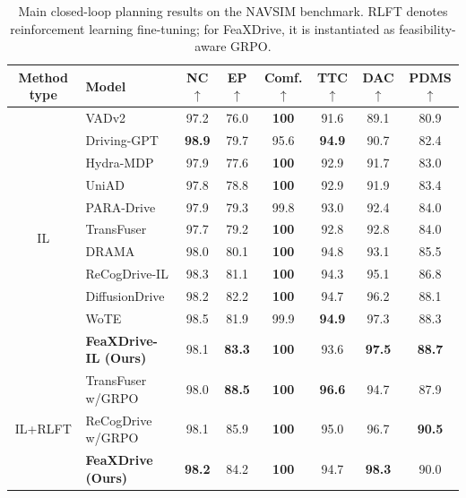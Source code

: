 \documentclass[3p,times,authoryear]{elsarticle}
\begin{document}
\begin{table}[t]
\centering
\caption{Main closed-loop planning results on the NAVSIM benchmark. RLFT denotes reinforcement learning fine-tuning; for FeaXDrive, it is instantiated as feasibility-aware GRPO.}
\small
\setlength{\tabcolsep}{5pt}
\renewcommand{\arraystretch}{1.05}
\begin{tabular}{c|l|c c c c|c|c}
\toprule
\textbf{Method type} & \textbf{Model} & \textbf{NC} $\uparrow$ & \textbf{EP} $\uparrow$ & \textbf{Comf.} $\uparrow$ & \textbf{TTC} $\uparrow$ & \textbf{DAC} $\uparrow$ & \textbf{PDMS} $\uparrow$ \\
\midrule
\multirow{11}{*}{IL}
& VADv2 \citep{vadv2}                   & 97.2 & 76.0 & \textbf{100}  & 91.6 & 89.1 & 80.9 \\
& Driving-GPT \citep{drivinggpt}        & \textbf{98.9} & 79.7 & 95.6 & \textbf{94.9} & 90.7 & 82.4 \\
& Hydra-MDP \citep{hydra_mdp}           & 97.9 & 77.6 & \textbf{100}  & 92.9 & 91.7 & 83.0 \\
& UniAD \citep{hu2023uniad}                   & 97.8 & 78.8 & \textbf{100}  & 92.9 & 91.9 & 83.4 \\
& PARA-Drive \citep{paradrive}          & 97.9 & 79.3 & 99.8 & 93.0 & 92.4 & 84.0 \\
& TransFuser \citep{transfuser}         & 97.7 & 79.2 & \textbf{100}  & 92.8 & 92.8 & 84.0 \\
& DRAMA \citep{drama}                   & 98.0 & 80.1 & \textbf{100}  & 94.8 & 93.1 & 85.5 \\
& ReCogDrive-IL \citep{li2025recogdrive}      & 98.3 & 81.1 & \textbf{100}  & 94.3 & 95.1 & 86.8 \\
& DiffusionDrive \citep{liao2025diffusiondrive} & 98.2 & 82.2 & \textbf{100}  & 94.7 & 96.2 & 88.1 \\
& WoTE \citep{wote}                     & 98.5 & 81.9 & 99.9 & \textbf{94.9} & 97.3 & 88.3 \\
& \textbf{FeaXDrive-IL (Ours)}                   & 98.1 & \textbf{83.3} & \textbf{100}  & 93.6 & \textbf{97.5} & \textbf{88.7} \\
\midrule
\multirow{3}{*}{IL+RLFT}
& TransFuser w/GRPO \citep{transfuser}  & 98.0 & \textbf{88.5} & \textbf{100} & \textbf{96.6} & 94.7 & 87.9 \\
& ReCogDrive w/GRPO \citep{li2025recogdrive}  & 98.1 & 85.9 & \textbf{100} & 95.0 & 96.7 & \textbf{90.5} \\
& \textbf{FeaXDrive (Ours)}               & \textbf{98.2} & 84.2 & \textbf{100} & 94.7 & \textbf{98.3} & 90.0 \\
\bottomrule
\end{tabular}
\label{tab:navsim_main_results}
\end{table}
\end{document}
